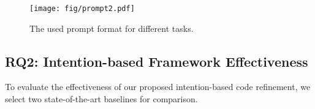 
\begin{figure}[!t]
\centering
\texttt{[image: fig/prompt2.pdf]}
\vspace{-2mm}
\caption{The used prompt format for different tasks.}
\label{fig:prompt2}
\vspace{-4mm}
\end{figure}


\subsection{RQ2: Intention-based Framework Effectiveness}
To evaluate the effectiveness of our proposed intention-based code refinement, we select two state-of-the-art baselines for comparison. 



